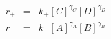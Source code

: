 \begin{eqnarray}
r_+ & = & k_+[C]^{\gamma_C}[D]^{\gamma_D} \\
r_- & = & k_-[A]^{\gamma_A}[B]^{\gamma_B} \\
\end{eqnarray}